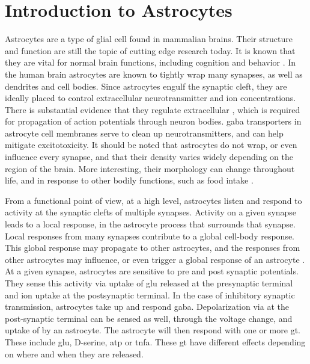     \section{Introduction to Astrocytes}
    Astrocytes are a type of glial cell found in mammalian brains. Their
    structure and function are still the topic of cutting edge research
    today. It is known that they are vital for normal brain functions, including
    cognition and behavior \parencite{mederos_2018}. In the human brain astrocytes
    are known to tightly wrap many synapses, as well as dendrites and cell
    bodies. Since astrocytes engulf the synaptic cleft, they are ideally
    placed to control extracellular neurotransmitter and ion
    concentrations. There is substantial evidence that they regulate
    extracellular \kp, which is required for propagation of action potentials
    through neuron bodies. \Gls{gaba} transporters in astrocyte cell membranes
    serve to clean up neurotransmitters, and can help mitigate excitotoxicity. It
    should be noted that astrocytes do not wrap, or even influence every
    synapse, and that their density varies widely depending on the region of the
    brain. More interesting, their morphology can change throughout life, and in
    response to other bodily functions, such as food intake \parencite{mederos_2018}.

    From a functional point of view, at a high level, astrocytes listen and
    respond to activity at the synaptic clefts of multiple synapses. Activity on
    a given synapse leads to a local response, in the astrocyte process that
    surrounds that synapse. Local responses from many synapses contribute to a
    global cell-body response. This global response may propagate to other
    astrocytes, and the responses from other astrocytes may influence, or even
    trigger a global response of an astrocyte \parencite{min_2012}. At a given
    synapse, astrocytes are sensitive to pre and post synaptic potentials. They
    sense this activity via uptake of \gls{glu} released at the presynaptic
    terminal and \kp ion uptake at the postsynaptic terminal. In the case
    of inhibitory synaptic transmission, astrocytes take up and respond
    \gls{gaba}. Depolarization via \kp at the post-synaptic terminal can be
    sensed as well, through the voltage change, and uptake of \kp by an
    astrocyte. The astrocyte will then respond with one or more
    \gls{gt}. These include \gls{glu}, D-serine, \gls{atp} or
    \gls{tnfa}. These \gls{gt} have different effects depending on where
    and when they are released.


